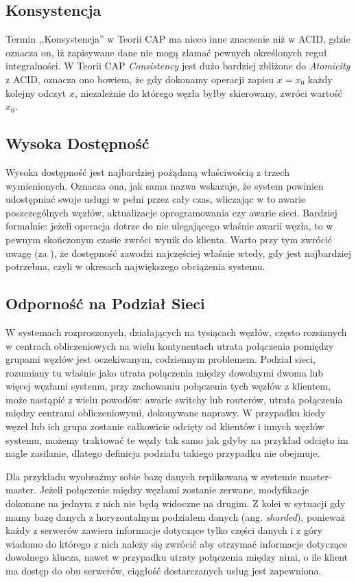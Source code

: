 \subsection*{Konsystencja}

Termin ,,Konsystencja'' w Teorii CAP ma nieco inne znaczenie niż w ACID, gdzie oznacza on, iż zapisywane dane nie mogą złamać pewnych określonych reguł integralności. 
W Teorii CAP \emph{Consistency} jest dużo bardziej zbliżone do \emph{Atomicity} z ACID, oznacza ono bowiem, że gdy dokonamy operacji zapisu $x=x_0$ każdy kolejny odczyt $x$, niezależnie do którego węzła byłby skierowany, zwróci wartość $x_0$.

\subsection*{Wysoka Dostępność}

Wysoka dostępność jest najbardziej pożądaną właściwością z trzech wymienionych.
Oznacza ona, jak sama nazwa wskazuje, że system powinien udostępniać swoje usługi w pełni przez cały czas, wliczając w to awarie poszczególnych węzłów, aktualizacje oprogramowania czy awarie sieci. 
Bardziej formalnie: jeżeli operacja dotrze do nie ulegającego właśnie awarii węzła, to w pewnym skończonym czasie zwróci wynik do klienta.
Warto przy tym zwrócić uwagę (za  \cite{brewers-conjecture}), że dostępność zawodzi najczęściej właśnie wtedy, gdy jest najbardziej potrzebna, czyli w okresach największego obciążenia systemu.

\subsection*{Odporność na Podział Sieci}

W systemach rozproszonych, działających na tysiącach węzłów, często rozsianych w centrach obliczeniowych na wielu kontynentach utrata połączenia pomiędzy grupami węzłów jest oczekiwanym, codziennym problemem.
Podział sieci, rozumiany tu właśnie jako utrata połączenia między dowolnymi dwoma lub więcej węzłami systemu, przy zachowaniu połączenia tych węzłów z klientem, może nastąpić z wielu powodów: awarie switchy lub routerów, utrata połączenia między centrami obliczeniowymi, dokonywane naprawy.
W przypadku kiedy węzeł lub ich grupa zostanie całkowicie odcięty od klientów i innych węzłów systemu, możemy traktować te węzły tak samo jak gdyby na przykład odcięto im nagle zasilanie, dlatego definicja podziału takiego przypadku nie obejmuje.

Dla przykładu wyobraźmy sobie bazę danych replikowaną w systemie master-master.
Jeżeli połączenie między węzłami zostanie zerwane, modyfikacje dokonane na jednym z nich nie będą widoczne na drugim. 
Z kolei w sytuacji gdy mamy bazę danych z horyzontalnym podziałem danych (ang. \emph{sharded}), ponieważ każdy z serwerów zawiera informacje dotyczące tylko części danych i z góry wiadomo do którego z nich należy się zwrócić aby otrzymać informacje dotyczące dowolnego klucza, nawet w przypadku utraty połączenia między nimi, o ile klient ma dostęp do obu serwerów, ciągłość dostarczanych usług jest zapewniona.

